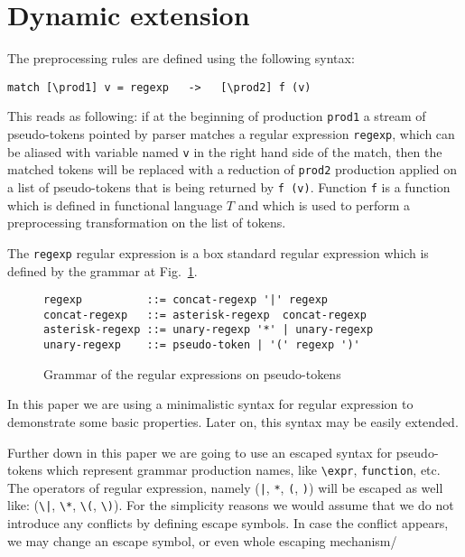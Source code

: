 \section{\label{sec:dynext}Dynamic extension}

The preprocessing rules are defined using the following syntax:
\begin{verbatim}
match [\prod1] v = regexp   ->   [\prod2] f (v)
\end{verbatim}
This reads as following: if at the beginning of production \verb|prod1|
a stream of pseudo-tokens pointed by parser matches a regular expression
\verb|regexp|, which can be aliased with variable named \verb|v| in the
right hand side of the match, then the matched tokens will be replaced 
with a reduction of \verb|prod2| production applied on a list of 
pseudo-tokens that is being returned by \verb|f (v)|.  Function \verb|f|
is a function which is defined in functional language $T$ and which
is used to perform a preprocessing transformation on the list of 
tokens.  

The \verb|regexp| regular expression is a box standard regular
expression which is defined by the grammar at Fig.~\ref{fig:reggram}.
\begin{figure}[h!]
\begin{verbatim}
regexp          ::= concat-regexp '|' regexp
concat-regexp   ::= asterisk-regexp  concat-regexp
asterisk-regexp ::= unary-regexp '*' | unary-regexp
unary-regexp    ::= pseudo-token | '(' regexp ')'
\end{verbatim}
\caption{\label{fig:reggram}Grammar of the regular expressions on
pseudo-tokens}
\end{figure}
In this paper we are using a minimalistic syntax for regular expression
to demonstrate some basic properties.  Later on, this syntax may be 
easily extended.

Further down in this paper we are going to use an escaped syntax 
for pseudo-tokens which represent grammar production names, like
\verb|\expr|, \verb|function|, etc.  The operators of regular
expression, namely (\verb/|/, \verb|*|, \verb|(|, \verb|)|) will
be escaped as well like: (\verb/\|/, \verb|\*|, \verb|\(|, \verb|\)|).
For the simplicity reasons we would assume that we do not introduce
any conflicts by defining escape symbols.  In case the conflict 
appears, we may change an escape symbol, or even whole escaping
mechanism/
